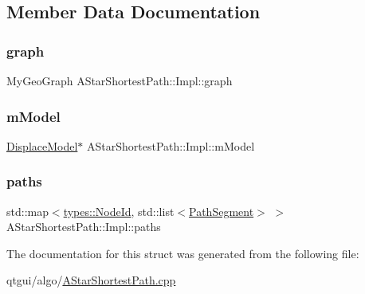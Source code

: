 \subsection{Member Data Documentation}
\mbox{\label{struct_a_star_shortest_path_1_1_impl_a038762cd3a18c21ca215822c9f75bec8}} 
\subsubsection{\texorpdfstring{graph}{graph}}
{\footnotesize\ttfamily My\+Geo\+Graph A\+Star\+Shortest\+Path\+::\+Impl\+::graph}

\mbox{\label{struct_a_star_shortest_path_1_1_impl_acea59d8fd9fd3b48c426686d872e9d27}} 
\subsubsection{\texorpdfstring{mModel}{mModel}}
{\footnotesize\ttfamily \mbox{\hyperlink{class_displace_model}{Displace\+Model}}$\ast$ A\+Star\+Shortest\+Path\+::\+Impl\+::m\+Model}

\mbox{\label{struct_a_star_shortest_path_1_1_impl_a03b8667c177a77302b4310bc5a311d19}} 
\subsubsection{\texorpdfstring{paths}{paths}}
{\footnotesize\ttfamily std\+::map$<$\mbox{\hyperlink{classtypes_1_1_node_id}{types\+::\+Node\+Id}}, std\+::list$<$\mbox{\hyperlink{struct_a_star_shortest_path_1_1_impl_1_1_path_segment}{Path\+Segment}}$>$ $>$ A\+Star\+Shortest\+Path\+::\+Impl\+::paths}



The documentation for this struct was generated from the following file\+:\begin{DoxyCompactItemize}
\item 
qtgui/algo/\mbox{\hyperlink{_a_star_shortest_path_8cpp}{A\+Star\+Shortest\+Path.\+cpp}}\end{DoxyCompactItemize}
